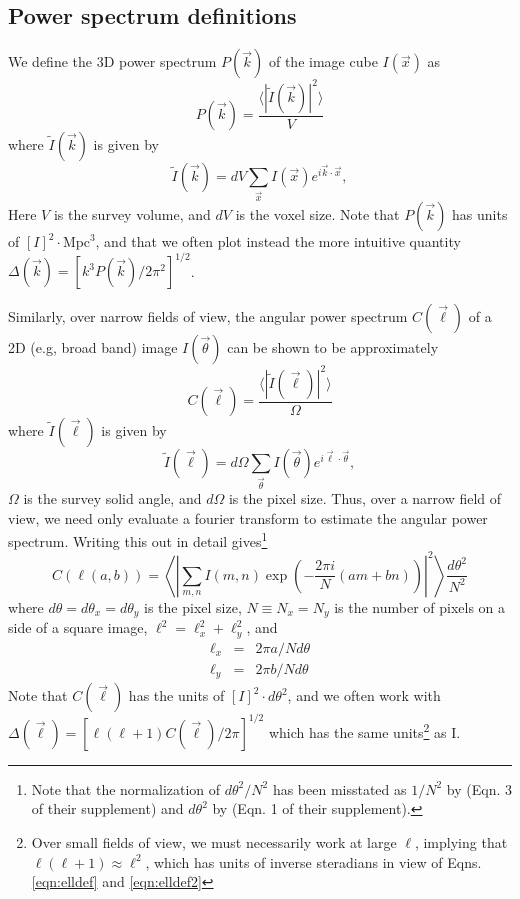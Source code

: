 \documentclass{emulateapj}
\begin{document}
\subsection{Power spectrum definitions}
\label{sec:pspecdefs}

We define the 3D power spectrum $P(\vec{k})$ of the image cube $I(\vec{x})$ as 
\begin{equation}
\label{eqn:pspec3Ddef}
	P(\vec{k}) = \frac{\langle|\tilde{I}(\vec{k})|^2\rangle}{V}
\end{equation}
where $\tilde{I}(\vec{k})$ is given by
\begin{equation}
	\tilde{I}(\vec{k})=dV\sum_{\vec{x}}I(\vec{x})e^{i\vec{k}\cdot\vec{x}},
\end{equation}
Here $V$ is the survey volume, and $dV$ is the voxel size. Note that $P(\vec{k})$ has units of $[I]^2\cdot\text{Mpc}^3$, and that we often plot instead the more intuitive quantity $\Delta(\vec{k})=[k^3P(\vec{k})/2\pi^2]^{1/2}$.

Similarly, over narrow fields of view, the angular power spectrum $C(\vec{\ell})$ of a 2D (e.g, broad band) image $I(\vec{\theta})$ can be shown to be approximately
\begin{equation}
\label{eqn:Cldef0}
	C(\vec{\ell}) = \frac{\langle|\tilde{I}(\vec{\ell})|^2\rangle}{\Omega} 
\end{equation}
where $\tilde{I}(\vec{\ell})$ is given by
\begin{equation}
	\tilde{I}(\vec{\ell})=d\Omega\sum_{\vec{\theta}}I(\vec{\theta})e^{i\vec{\ell}\cdot\vec{\theta}},
\end{equation}
$\Omega$ is the survey solid angle, and $d\Omega$ is the pixel size. Thus, over a narrow field of view, we need only evaluate a fourier transform to estimate the angular power spectrum. Writing this out in detail gives\footnote{Note that the normalization of $d\theta^2/N^2$ has been misstated as $1/N^2$ by \citet{zemcov14} (Eqn. 3 of their supplement) and $d\theta^2$ by \citet{cooray12} (Eqn. 1 of their supplement).} 
\begin{equation}
\label{eqn:Cldef}
	C(\ell(a,b))=\left\langle\left|\sum_{m,n}I(m,n)\exp\left(-\frac{2\pi i}{N}  (am+bn)\right)\right|^2\right\rangle\frac{d\theta^2}{N^2}
\end{equation}
where $d\theta=d\theta_x=d\theta_y$ is the pixel size, $N\equiv N_x=N_y$ is the number of pixels on a side of a square image, $\ell^2=\ell_x^2+\ell_y^2$, and 
\begin{eqnarray}
\ell_x&=&2\pi a/N d\theta \label{eqn:elldef}\\
\ell_y&=&2\pi b/Nd\theta \label{eqn:elldef2}
\end{eqnarray}
Note that $C(\vec{\ell})$ has the units of $[I]^2\cdot d\theta^2$, and we often work with $\Delta(\vec{\ell})=[\ell(\ell+1)C(\vec{\ell})/2\pi]^{1/2}$ which has the same units\footnote{Over small fields of view, we must necessarily work at large $\ell$, implying that $\ell(\ell+1)\approx\ell^2$, which has units of inverse steradians in view of Eqns. \ref{eqn:elldef} and \ref{eqn:elldef2}} as I.
\end{document}
